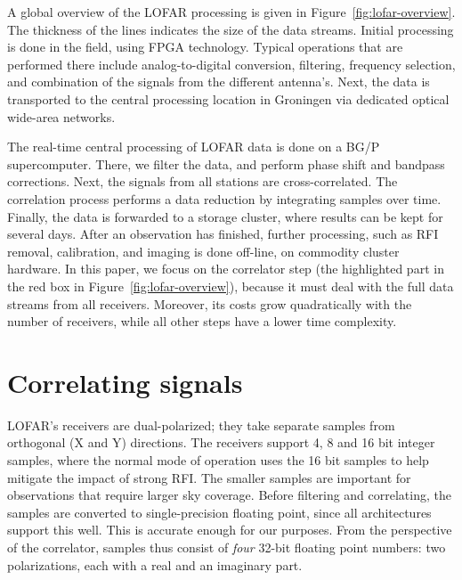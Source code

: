 \documentclass{article}
\begin{document}
A global overview of the LOFAR processing is given in
Figure~\ref{fig:lofar-overview}. The thickness of the lines indicates
the size of the data streams.  Initial processing is done in the
field, using FPGA technology.  Typical operations that are performed
there include analog-to-digital conversion, filtering, frequency
selection, and combination of the signals from the different
antenna's.  Next, the data is transported to the central processing
location in Groningen via dedicated optical wide-area networks.

The real-time central processing of LOFAR data is done on
a BG/P supercomputer.  There, we filter the data, and
perform phase shift and bandpass corrections.
Next, the signals from all stations are cross-correlated.  The
correlation process performs a data reduction by integrating samples
over time.  Finally, the data is forwarded to a storage cluster, where
results can be kept for several days.  After an observation has
finished, further processing, such as RFI removal, calibration, and imaging is done off-line, on commodity cluster
hardware.  
In this paper, we focus on the correlator step (the
highlighted part in the red box in
Figure~\ref{fig:lofar-overview}), because it must deal with the
full data streams from all receivers. Moreover, its costs grow
quadratically with the number of receivers, while all other steps have
a lower time complexity.


\section{Correlating signals}
\label{sec:correlating}






LOFAR's receivers are dual-polarized; they take separate
samples from orthogonal (X and Y) directions.  The receivers
support 4, 8 and 16 bit integer samples, where the normal mode of
operation uses the 16 bit samples to help mitigate the impact of strong RFI. The smaller samples are important
for observations that require larger sky coverage. 
Before filtering and correlating, the
samples are converted to single-precision floating point, since all
architectures support this well.  This is
accurate enough for our purposes. From the perspective of the
correlator, samples thus consist of \emph{four} 32-bit floating point
numbers: two polarizations, each with a real and an imaginary part.
\end{document}
